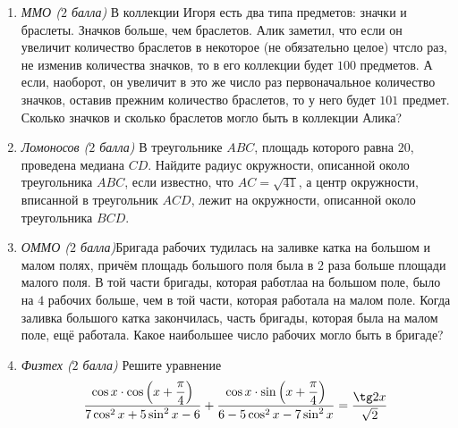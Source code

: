 


\clearpage
\pagestyle{empty}
\begin{enumerate}
    \item \textit{ММО ($2$ балла)} В коллекции Игоря есть два типа предметов: значки и браслеты. Значков больше, чем браслетов. Алик заметил, что если он увеличит количество браслетов в некоторое (не обязательно целое) чтсло раз, не изменив количества значков, то в его коллекции будет $100$ предметов. А если, наоборот, он увеличит в это же число раз первоначальное количество значков, оставив прежним количество браслетов, то у него будет $101$ предмет. Сколько значков и сколько браслетов могло быть в коллекции Алика?
    \item \textit{Ломоносов ($2$ балла)} В треугольнике $ABC$, площадь которого равна $20$, проведена медиана $CD$. Найдите радиус окружности, описанной около треугольника $ABC$, если известно, что $AC=\sqrt{41}$, а центр окружности, вписанной в треугольник $ACD$, лежит на окружности, описанной около треугольника $BCD$.
    \item \textit{ОММО ($2$ балла)}Бригада рабочих тудилась на заливке катка на большом и малом полях, причём площадь большого поля была в $2$ раза больше площади малого поля. В той части бригады, которая работлаа на большом поле, было на $4$ рабочих больше, чем в той части, которая работала на малом поле. Когда заливка большого катка закончилась, часть бригады, которая была на малом поле, ещё работала. Какое наибольшее число рабочих могло быть в бригаде?
    \item \textit{Физтех ($2$ балла)} Решите уравнение \[\frac{\cos x\cdot\cos \left(x+\dfrac{\pi}{4}\right)}{7\cos^2x+5\sin^2x-6}+\frac{\cos x\cdot\sin\left(x+\dfrac{\pi}{4}\right)}{6-5\cos^2x-7\sin^2x}=\frac{\tg 2x}{\sqrt{2}}\]
\end{enumerate}
